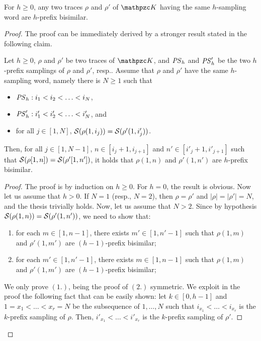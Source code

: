 \begin{lemma*}[\ref{lemma:prefixSamplingOneRegex}] For $h\geq 0$, any two traces
$\rho$ and  $\rho'$ of $\Ku$ having the same
$h$-sampling word are $h$-prefix bisimilar.
\end{lemma*}

\begin{proof}
The proof can be immediately derived by a stronger result stated in the following claim.
%
\begin{claim}\label{lab:clAux} Let $h\geq 0$,  $\rho$ and  $\rho'$ be two traces of $\Ku$, and ${\mathit{PS}}_h$ and ${\mathit{PS}}'_h$ be the two $h$-prefix samplings
of $\rho$ and $\rho'$, resp.. Assume that $\rho$ and $\rho'$ have the same $h$-sampling word, namely there is $N\geq 1$ such that
 \begin{itemize}
   \item 
   ${\mathit{PS}}_h: i_1<i_2<\ldots < i_N$,
   \item 
   ${\mathit{PS}}'_h: i'_1<i'_2<\ldots < i'_N$, and
   \item 
  for all $j\in [1,N]$, $\mathcal{S}(\rho(1,i_j))=\mathcal{S}(\rho'(1,i'_j))$.
 \end{itemize}

 Then, for all $j\in [1,N-1]$, $n\in [i_j+1,i_{j+1}]$ and $n'\in [i'_j+1,i'_{j+1}]$ such that $\mathcal{S}(\rho[1,n])=\mathcal{S}(\rho'[1,n'])$, it holds that
 $\rho(1,n)$ and $\rho'(1,n')$ are $h$-prefix bisimilar.
\end{claim}
\begin{proof} The proof is by induction on $h\geq 0$. For $h=0$, the result is obvious. Now let us assume that $h>0$. If $N=1$ (resp., $N=2$), then
$\rho=\rho'$  and $|\rho|=|\rho'|=N$, and the thesis trivially holds.
Now, let us assume that $N>2$. Since by hypothesis $\mathcal{S}(\rho(1,n))=\mathcal{S}(\rho'(1,n'))$, we need to show that:
 \begin{enumerate}
   \item for each $m\in [1,n-1]$, there exists $m'\in [1,n'-1]$ such that $\rho(1,m)$ and $\rho'(1,m')$ are $(h-1)$-prefix bisimilar;
   \item for each $m'\in [1,n'-1]$, there exists $m\in [1,n-1]$ such that $\rho(1,m)$ and $\rho'(1,m')$ are $(h-1)$-prefix bisimilar;
 \end{enumerate}
We only prove $(1.)$, being the proof of $(2.)$ symmetric. We exploit in the proof the following fact that can be easily shown:
%
let $k\in [0,h-1]$ and $1=x_1<\ldots <x_r=N$ be the subsequence of $1,\ldots,N$ such that
$i_{x_1}<\ldots<i_{x_r}$ is the $k$-prefix sampling of $\rho$. Then, $i'_{x_1}<\ldots<i'_{x_r}$ is the $k$-prefix sampling of $\rho'$.


\end{proof}
\end{proof}
